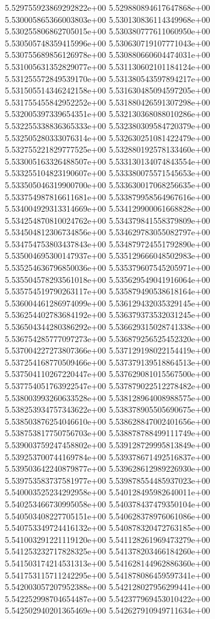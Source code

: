 5.529755923869292822e+00
5.529880894617647868e+00
5.530005865366003803e+00
5.530130836114349968e+00
5.530255806862705015e+00
5.530380777611060950e+00
5.530505748359415996e+00
5.530630719107771043e+00
5.530755689856126978e+00
5.530880660604474031e+00
5.531005631352829077e+00
5.531130602101184124e+00
5.531255572849539170e+00
5.531380543597894217e+00
5.531505514346242158e+00
5.531630485094597205e+00
5.531755455842952252e+00
5.531880426591307298e+00
5.532005397339654351e+00
5.532130368088010286e+00
5.532255338836365333e+00
5.532380309584720379e+00
5.532505280333076314e+00
5.532630251081422479e+00
5.532755221829777525e+00
5.532880192578133460e+00
5.533005163326488507e+00
5.533130134074843554e+00
5.533255104823190607e+00
5.533380075571545653e+00
5.533505046319900700e+00
5.533630017068256635e+00
5.533754987816611681e+00
5.533879958564967616e+00
5.534004929313314669e+00
5.534129900061668828e+00
5.534254870810024762e+00
5.534379841558379809e+00
5.534504812306734856e+00
5.534629783055082797e+00
5.534754753803437843e+00
5.534879724551792890e+00
5.535004695300147937e+00
5.535129666048502983e+00
5.535254636796850036e+00
5.535379607545205971e+00
5.535504578293561018e+00
5.535629549041916064e+00
5.535754519790263117e+00
5.535879490538618164e+00
5.536004461286974099e+00
5.536129432035329145e+00
5.536254402783684192e+00
5.536379373532031245e+00
5.536504344280386292e+00
5.536629315028741338e+00
5.536754285777097273e+00
5.536879256525452320e+00
5.537004227273807366e+00
5.537129198022154419e+00
5.537254168770509466e+00
5.537379139518864513e+00
5.537504110267220447e+00
5.537629081015567500e+00
5.537754051763922547e+00
5.537879022512278482e+00
5.538003993260633528e+00
5.538128964008988575e+00
5.538253934757343622e+00
5.538378905505690675e+00
5.538503876254046610e+00
5.538628847002401656e+00
5.538753817750756703e+00
5.538878788499111749e+00
5.539003759247458802e+00
5.539128729995813849e+00
5.539253700744169784e+00
5.539378671492516837e+00
5.539503642240879877e+00
5.539628612989226930e+00
5.539753583737581977e+00
5.539878554485937023e+00
5.540003525234292958e+00
5.540128495982640011e+00
5.540253466730995058e+00
5.540378437479350104e+00
5.540503408227705151e+00
5.540628378976061086e+00
5.540753349724416132e+00
5.540878320472763185e+00
5.541003291221119120e+00
5.541128261969473279e+00
5.541253232717828325e+00
5.541378203466184260e+00
5.541503174214531313e+00
5.541628144962886360e+00
5.541753115711242295e+00
5.541878086459597341e+00
5.542003057207952388e+00
5.542128027956299441e+00
5.542252998704654487e+00
5.542377969453010422e+00
5.542502940201365469e+00
5.542627910949711634e+00
